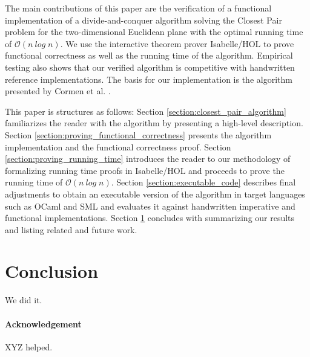 \documentclass{llncs}
\begin{document}
The main contributions of this paper are the verification of a functional implementation of a
divide-and-conquer algorithm solving the Closest Pair problem for the two-dimensional Euclidean plane
with the optimal running time of $\mathcal{O}(n\ \mathit{log}\;n)$. We use the interactive theorem 
prover Isabelle/HOL \cite{LNCS2283,Concrete} to prove functional correctness as well as the 
running time of the algorithm. Empirical testing also shows that our verified algorithm is 
competitive with handwritten reference implementations. The basis for our implementation 
is the algorithm presented by Cormen et al. \cite{Introduction-to-Algorithms:2009}.

This paper is structures as follows:
Section \ref{section:closest_pair_algorithm} familiarizes the reader with the algorithm by presenting a
high-level description. Section \ref{section:proving_functional_correctness} presents the algorithm
implementation and the functional correctness proof. Section \ref{section:proving_running_time} introduces
the reader to our methodology of formalizing running time proofs in Isabelle/HOL and proceeds to prove 
the running time of $\mathcal{O}(n\ \mathit{log}\;n)$. Section \ref{section:executable_code}
describes final adjustments to obtain an executable version of the algorithm in target languages
such as OCaml and SML and evaluates it against handwritten imperative and functional implementations. 
Section \ref{section:conclusion} concludes with summarizing our results and listing related and future work.



\section{Conclusion} \label{section:conclusion}

We did it.

\paragraph{Acknowledgement}
XYZ helped.



\end{document}
